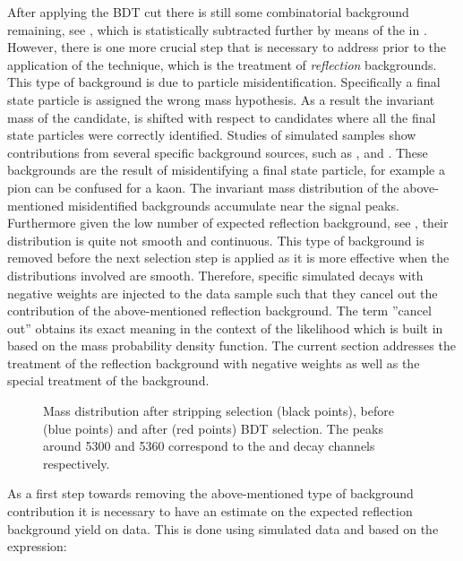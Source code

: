 After applying the BDT cut there is still some combinatorial background remaining, see ,
which is statistically subtracted further by means of the \sWeights in .
However, there is one more crucial step that is necessary to address prior to the application of the
\sPlot technique, which is the treatment of {\it reflection} backgrounds. This type of background is due to particle misidentification.
Specifically a final state particle is assigned the wrong mass hypothesis. As a result the invariant mass of the \Bs candidate,
is shifted with respect to \Bs candidates where all the final state particles were correctly identified.
Studies of simulated samples show contributions
from several specific background sources, such as \BsJpsiKK, \BsJpsipipi and \BdJpsipipi.
These backgrounds are the result of misidentifying a final state particle, for example a pion can
be confused for a kaon. The invariant mass distribution of the above-mentioned misidentified backgrounds
accumulate near the \BJpsiKpi signal peaks. Furthermore given the low number of expected reflection background,
see , their distribution is quite not smooth and continuous. This type of background is
removed before the next selection step is applied as it is more effective when the distributions involved are smooth.
Therefore, specific simulated decays with negative weights
are injected to the data sample such that they cancel out the contribution of the above-mentioned reflection
background. The term ''cancel out'' obtains its exact meaning in the context of the likelihood which is
built in  based on the mass probability density function.
The current section addresses the treatment of the reflection background with negative weights
as well as the special treatment of the \LbJpsippi background.

\begin{figure}[!t]
  \centering
  \scalebox{1}{}
  \caption{Mass distribution after stripping selection (black points), before (blue points) and after (red points) BDT selection.
           The peaks around 5300 and 5360 \mevcc correspond to the \BdJpsiKst and \BsJpsiKst decay channels respectively.}
  \label{mass_BDTG_selection}
\end{figure}

As a first step towards removing the above-mentioned type of background contribution it is necessary to have an estimate
on the expected reflection background yield on data. This is done using simulated data and based on the expression:

